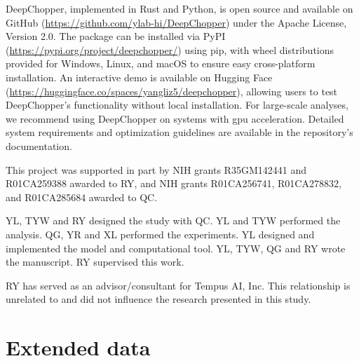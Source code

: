 \documentclass[pdflatex,sn-nature, lineno]{sn-jnl}%
\def\theHfigure{fig.\thefigure}
\def\theHtable{tab.\thetable}
\begin{document}

DeepChopper, implemented in Rust and Python, is open source and available on GitHub (\url{https://github.com/ylab-hi/DeepChopper}) under the Apache License, Version 2.0.
The package can be installed via PyPI (\url{https://pypi.org/project/deepchopper/}) using pip, with wheel distributions provided for Windows, Linux, and macOS to ensure easy cross-platform installation.
An interactive demo is available on Hugging Face (\url{https://huggingface.co/spaces/yangliz5/deepchopper}), allowing users to test DeepChopper's functionality without local installation.
For large-scale analyses, we recommend using DeepChopper on systems with \gls{gpu} acceleration. Detailed system requirements and optimization guidelines are available in the repository's documentation.


This project was supported in part by NIH grants R35GM142441 and R01CA259388 awarded to RY, and NIH grants R01CA256741, R01CA278832, and R01CA285684 awarded to QC.


YL, TYW and RY designed the study with QC. YL and TYW performed the analysis. QG, YR and XL performed the experiments. YL designed and implemented the model and computational tool. YL, TYW, QG and RY wrote the manuscript. RY supervised this work.


RY has served as an advisor/consultant for Tempus AI, Inc. This relationship is unrelated to and did not influence the research presented in this study.

\backmatter

\begin{appendices}
	\printglossaries
\end{appendices}


\newpage

\section{Extended data}

\makeatletter
\renewcommand{\theHfigure}{extended.\thefigure}
\renewcommand{\theHtable}{extended.\thetable}
\makeatother

\renewcommand{\figurename}{Extended Data Fig.}
\renewcommand{\tablename}{Extended Data Table}
\setcounter{figure}{0}
\setcounter{table}{0}
\end{document}
